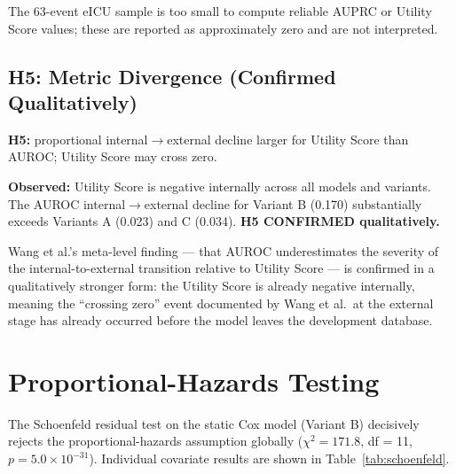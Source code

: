 The 63-event eICU sample is too small to compute reliable AUPRC or Utility Score
values; these are reported as approximately zero and are not interpreted.

\subsection{H5: Metric Divergence (Confirmed Qualitatively)}

\begin{mdframed}[backgroundcolor=ATUSand!30, linecolor=ATUGreen]
  \textbf{H5:} proportional internal$\to$external decline larger for Utility
  Score than AUROC; Utility Score may cross zero.

  \textbf{Observed:} Utility Score is negative internally across all models
  and variants. The AUROC internal$\to$external decline for Variant B (0.170)
  substantially exceeds Variants A (0.023) and C (0.034).
  \textbf{H5 CONFIRMED qualitatively.}
\end{mdframed}

Wang et al.'s \parencite{wang2025srpm} meta-level finding --- that AUROC underestimates
the severity of the internal-to-external transition relative to Utility Score ---
is confirmed in a qualitatively stronger form: the Utility Score is already
negative internally, meaning the ``crossing zero'' event documented by Wang et al.\
at the external stage has already occurred before the model leaves the development
database.

\section{Proportional-Hazards Testing}
\label{sec:schoenfeld}

The Schoenfeld residual test on the static Cox model (Variant B) decisively
rejects the proportional-hazards assumption globally ($\chi^2 = 171.8$,
df = 11, $p = 5.0 \times 10^{-31}$). Individual covariate results are shown
in Table~\ref{tab:schoenfeld}.

